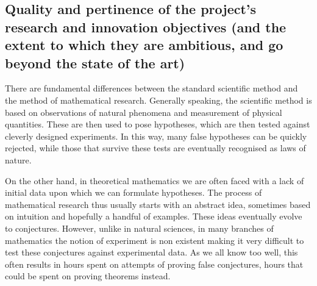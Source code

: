 \subsection{Quality and pertinence of the project’s research and innovation objectives (and the extent to which they are ambitious, and go beyond the state of the art)}
\label{sec:quality}


There are fundamental differences between the standard scientific method and the method of mathematical research.
Generally speaking, the scientific method is based on observations of natural phenomena and measurement of physical quantities.
These are then used to pose hypotheses, which are then tested against cleverly designed experiments.
In this way, many false hypotheses can be quickly rejected,
while those that survive these tests are eventually recognised as laws of nature.



On the other hand, in theoretical mathematics we are often faced with a lack of initial data upon which we can formulate hypotheses.
The process of mathematical research  thus usually starts with an abstract idea, sometimes based on intuition and hopefully a handful of examples.
These ideas eventually evolve to conjectures.
However, unlike in natural sciences, in many branches of mathematics the notion of experiment is non existent making it very difficult to test these conjectures against experimental data.
As we all know too well, this often results in hours spent on attempts of proving false conjectures, hours that could be spent on proving theorems instead.

